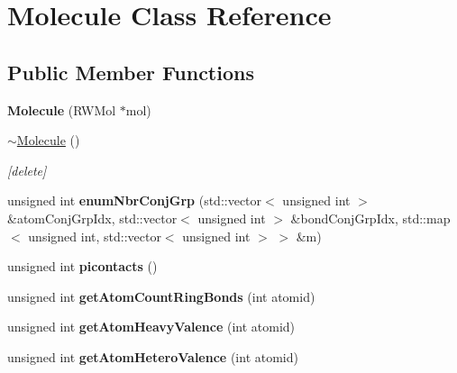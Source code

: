 \hypertarget{class_molecule}{}\section{Molecule Class Reference}
\label{class_molecule}
\subsection*{Public Member Functions}
\begin{DoxyCompactItemize}
\item 
\mbox{\label{class_molecule_a552677256bff6acac003617eddaa4233}} 
{\bfseries Molecule} (R\+W\+Mol $\ast$mol)
\item 
\mbox{\hyperlink{class_molecule_a1ff980b574a62526abff3d631c83bf94}{$\sim$\+Molecule}} ()
\begin{DoxyCompactList}\small\item\em \mbox{[}delete\mbox{]} \end{DoxyCompactList}\item 
\mbox{\label{class_molecule_a76f90edc870400248478fafdacd6efd3}} 
unsigned int {\bfseries enum\+Nbr\+Conj\+Grp} (std\+::vector$<$ unsigned int $>$ \&atom\+Conj\+Grp\+Idx, std\+::vector$<$ unsigned int $>$ \&bond\+Conj\+Grp\+Idx, std\+::map$<$ unsigned int, std\+::vector$<$ unsigned int $>$ $>$ \&m)
\item 
\mbox{\label{class_molecule_a491c0807f620c690bb8b5eab3bf7efcf}} 
unsigned int {\bfseries picontacts} ()
\item 
\mbox{\label{class_molecule_a180abc69d36d7909f3ed578475cc075c}} 
unsigned int {\bfseries get\+Atom\+Count\+Ring\+Bonds} (int atomid)
\item 
\mbox{\label{class_molecule_ab20d6bcc1513a5dbe3648eec782003df}} 
unsigned int {\bfseries get\+Atom\+Heavy\+Valence} (int atomid)
\item 
\mbox{\label{class_molecule_a1ff2823d05fb0c104bef3a2af09b4a21}} 
unsigned int {\bfseries get\+Atom\+Hetero\+Valence} (int atomid)
\item 
\mbox{\label{class_molecule_a9fb0b5f467ac50bb3eac31d194b5fba7}} 

\end{DoxyCompactItemize}
